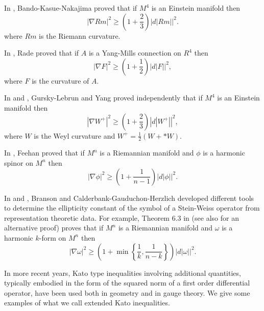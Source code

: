 \documentclass[12pt]{amsart} %
\theoremstyle{definition}
\numberwithin{equation}{section}
\begin{document}
In \cite{BKN1989}, Bando-Kasue-Nakajima proved that if $M^{4}$ is an Einstein manifold then
\[
\left|\nabla Rm\right|^{2}\geq\left(1+\frac{2}{3}\right)\left|d\left|Rm\right|\right|^{2}.
\]
where $Rm$ is the Riemann curvature.

In \cite{R1991}, Rade proved that if $A$ is a Yang-Mills connection
on $R^{4}$ then
\[
\left|\nabla F\right|^{2}\geq\left(1+\frac{1}{2}\right)\left|d\left|F\right|\right|^{2},
\]
where $F$ is the curvature of $A$.

In \cite{GL1999} and \cite{Y2000}, Gursky-Lebrun and Yang proved
independently that if $M^{4}$ is an Einstein manifold then
\[
\left|\nabla W^{+}\right|^{2}\geq\left(1+\frac{2}{3}\right)\left|d\left|W^{+}\right|\right|^{2},
\]
where $W$ is the Weyl curvature and $W^{+}=\frac{1}{2}\left(W+*W\right)$.

In \cite{F2001}, Feehan proved that if $M^{n}$ is a Riemannian manifold
and $\phi$ is a harmonic spinor on $M^{n}$ then
\[
\left|\nabla\phi\right|^{2}\geq\left(1+\frac{1}{n-1}\right)\left|d\left|\phi\right|\right|^{2}.
\]

In \cite{B2000} and \cite{CGH2000}, Branson and Calderbank-Gauduchon-Herzlich
developed different tools to determine the ellipticity constant of the symbol of a Stein-Weiss operator from representation theoretic data. For example, Theorem 6.3 in \cite{CGH2000} (see also \cite{CZ2012} for an alternative proof) proves that if $M^{n}$
is a Riemannian manifold and $\omega$ is a harmonic $k$-form on
$M^{n}$ then
\[
\left|\nabla\omega\right|^{2}\geq\left(1+\min\left\{ \frac{1}{k},\frac{1}{n-k}\right\} \right)\left|d\left|\omega\right|\right|^{2}.
\]




In more recent years, Kato type inequalities involving additional quantities, typically embodied in the form of the squared norm of a first order differential operator, have been used both in geometry and in gauge theory. We give some examples of what we call extended Kato inequalities.
\end{document}
